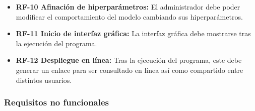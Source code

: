 \begin{itemize}
  \item \textbf{RF-10 Afinación de hiperparámetros:} El administrador debe poder modificar el comportamiento del modelo cambiando sus hiperparámetros.

  \item \textbf{RF-11 Inicio de interfaz gráfica:} La interfaz gráfica debe mostrarse tras la ejecución del programa.

  \item \textbf{RF-12 Despliegue en línea:} Tras la ejecución del programa, este debe generar un enlace para ser consultado en línea así como compartido entre distintos usuarios.
  
\end{itemize}

\subsubsection{Requisitos no funcionales}

